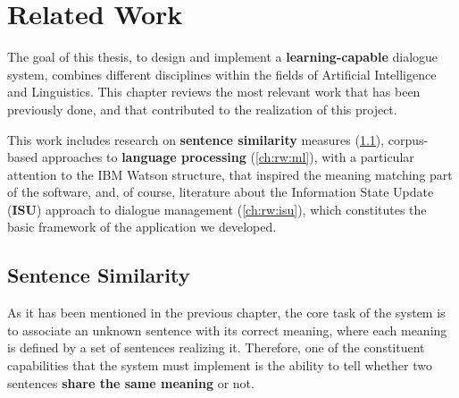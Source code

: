 
\chapter{Related Work} %

\label{ch:rw} %


The goal of this thesis, to design and implement a \textbf{learning-capable} dialogue system, combines different disciplines within the fields of Artificial Intelligence and Linguistics. This chapter reviews the most relevant work that has been previously done, and that contributed to the realization of this project.

This work includes research on \textbf{sentence similarity} measures (\ref{ch:rw:sim}), corpus-based approaches to \textbf{language processing} (\ref{ch:rw:ml}), with a particular attention to the IBM Watson structure, that inspired the meaning matching part of the software, and, of course, literature about the Information State Update (\textbf{ISU}) approach to dialogue management (\ref{ch:rw:isu}), which constitutes the basic framework of the application we developed.


\section{Sentence Similarity} \label{ch:rw:sim}
As it has been mentioned in the previous chapter, the core task of the system is to associate an unknown sentence with its correct meaning, where each meaning is defined by a set of sentences realizing it. Therefore, one of the constituent capabilities that the system must implement is the ability to tell whether two sentences \textbf{share the same meaning} or not.

